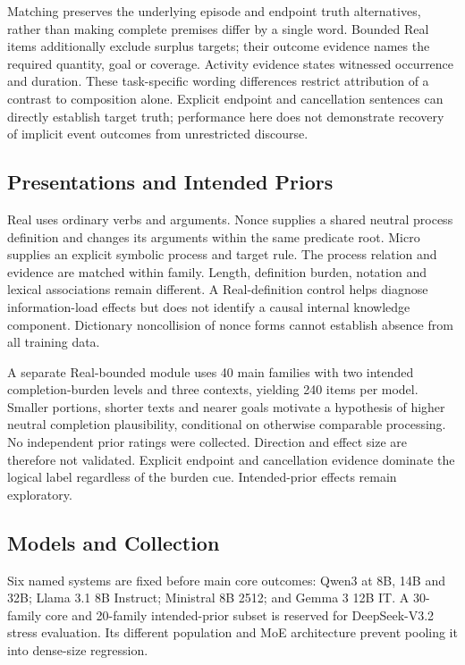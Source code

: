 \documentclass[sigconf,anonymous,review]{acmart}
\begin{document}
Matching preserves the underlying episode and endpoint truth alternatives, rather than making complete premises differ by a single word. Bounded Real items additionally exclude surplus targets; their outcome evidence names the required quantity, goal or coverage. Activity evidence states witnessed occurrence and duration. These task-specific wording differences restrict attribution of a contrast to composition alone. Explicit endpoint and cancellation sentences can directly establish target truth; performance here does not demonstrate recovery of implicit event outcomes from unrestricted discourse.

\subsection{Presentations and Intended Priors}
Real uses ordinary verbs and arguments. Nonce supplies a shared neutral process definition and changes its arguments within the same predicate root. Micro supplies an explicit symbolic process and target rule. The process relation and evidence are matched within family. Length, definition burden, notation and lexical associations remain different. A Real-definition control helps diagnose information-load effects but does not identify a causal internal knowledge component. Dictionary noncollision of nonce forms cannot establish absence from all training data.

A separate Real-bounded module uses 40 main families with two intended completion-burden levels and three contexts, yielding 240 items per model. Smaller portions, shorter texts and nearer goals motivate a hypothesis of higher neutral completion plausibility, conditional on otherwise comparable processing. No independent prior ratings were collected. Direction and effect size are therefore not validated. Explicit endpoint and cancellation evidence dominate the logical label regardless of the burden cue. Intended-prior effects remain exploratory.

\subsection{Models and Collection}
Six named systems are fixed before main core outcomes: Qwen3 at 8B, 14B and 32B; Llama 3.1 8B Instruct; Ministral 8B 2512; and Gemma 3 12B IT. A 30-family core and 20-family intended-prior subset is reserved for DeepSeek-V3.2 stress evaluation. Its different population and MoE architecture prevent pooling it into dense-size regression.
\end{document}
